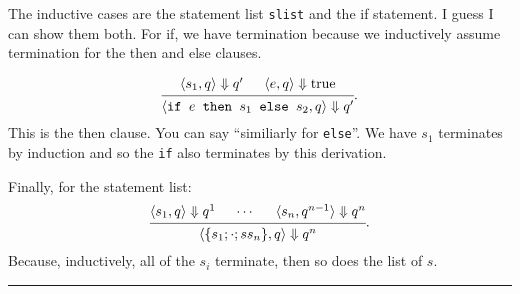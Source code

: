 \documentclass[11pt]{article}
\newcommand{\qedsymbol}{\rule{1ex}{1ex}}
\begin{document}
The inductive cases are the statement list \texttt{slist} and the if statement. I guess I can show them both.
For if, we have termination because we inductively assume termination for the then and else clauses.

\[
  \begin{prooftree}
    \hypo{\langle s_1, q \rangle \Downarrow q'}
    \hypo{\langle e, q \rangle \Downarrow \mbox{true}}
  \infer2{\langle \texttt{if $e$ then $s_1$ else $s_2$}, q \rangle \Downarrow q'}
  \end{prooftree}
  .
  \]
  This is the then clause. You can say ``similiarly for \texttt{else}''. We have $s_1$ terminates by induction
  and so the \texttt{if} also terminates by this derivation.

Finally, for the statement list:  
\[
  \begin{prooftree}
    \hypo{\langle s_1, q \rangle \Downarrow q^1}
    \hypo{\cdots}
    \hypo{\langle s_n, q^{n-1} \rangle \Downarrow q^n}
  \infer3{\langle \{ s_1 ; \cdot ;s s_n \}, q \rangle \Downarrow q^n}
  \end{prooftree}
  .
  \]
Because, inductively, all of the $s_i$ terminate, then so does the list of $s$. ~~\qedsymbol
\end{document}

